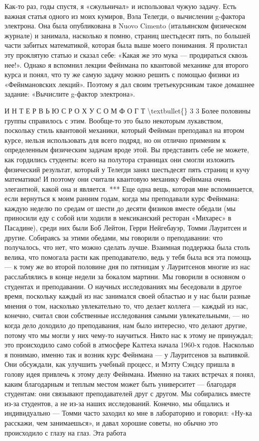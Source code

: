 \documentclass[10pt,oneside]{article}
\begin{document}
Как-то раз, годы спустя, я «сжульничал» и использовал чужую задачу. Есть важная статья одного из моих кумиров, Вэла Телегди, о вычислении g-фактора электрона. Она была опубликована в Nuovo Cimento (итальянском физическом журнале) и занимала, насколько я помню, страниц шестьдесят пять, по большей части забитых математикой, которая была выше моего понимания. Я пролистал эту проклятую статью и сказал себе: «Какая же это мука --- продираться сквозь нее!». Однако я вспомнил лекции Фейнмана по квантовой механике для второго курса и понял, что ту же самую задачу можно решить с помощью физики из «Фейнмановских лекций». Поэтому я дал своим третьекурсникам такое домашнее задание: «Вычислите g-фактор электрона».\par

И Н Т Е Р В Ь Ю  С  Р О Х У С О М  Ф О Г Т \textbackslash{}textbullet\{\} 3 3 Более половины группы справилось с этим. Вообще-то это было некоторым лукавством, поскольку стиль квантовой механики, который Фейнман преподавал на втором курсе, нельзя использовать для всего подряд, но он отлично применим к определенным физическим задачам вроде этой. Вы представить себе не можете, как гордились студенты: всего на полутора страницах они смогли изложить физический результат, который у Телегди занял шестьдесят пять страниц и кучу математики! И поэтому они считали квантовую механику Фейнмана очень элегантной, какой она и является. *** Еще одна вещь, которая мне вспоминается, если вернуться к моим ранним годам, когда мы преподавали курс Фейнмана: каждую неделю по средам от шести до десяти физиков вместе обедали (мы приносили еду с собой или ходили в мексиканский ресторан «Михарес» в Пасадине), среди них были Боб Лейтон, Герри Нейгебауэр, Томми Лауритсен и другие. Собираясь за этими обедами, мы говорили о преподавании: что получалось, что нет, что можно сделать лучше. Взаимная поддержка была столь велика, что помогала расти как преподавателю, ведь у тебя была вся эта помощь --- к тому же во второй половине дня по пятницам у Лауритсенов многие из нас расслаблялись в конце недели за бокалом мартини. Мы говорили в основном о студентах и преподавании. О научных исследованиях мы беседовали в другое время, поскольку каждый из нас занимался своей областью и у нас были разные мнения о том, насколько увлекательно то, что делает коллега --- каждый из нас, конечно, считал свои собственные исследования самыми увлекательными, --- но когда дело доходило до преподавания, нам было интересно, что делают другие, потому что мы могли у них чему-то научиться. Никто нас к этому не принуждал; это происходило само собой в атмосфере Калтеха начала 1960-х годов. Насколько я понимаю, именно так и возник курс Фейнмана --- у Лауритсенов за выпивкой. Они обсуждали, как улучшить учебный процесс, и Мэтту Сэндсу пришла в голову идея привлечь к этому делу Фейнмана. Именно на таких встречах я понял, каким благодарным и теплым местом может быть университет --- благодаря студентам: они связывают преподавателей друг с другом. Мы собирались вместе из-за студентов, а не из-за наших исследований. Конечно, мы общались и индивидуально --- Томми часто заходил ко мне в лабораторию и говорил: «Ну-ка расскажи, чем занимаешься», и давал хорошие советы, но обычно это происходило с глазу на глаз. Эта работа 
\end{document}
